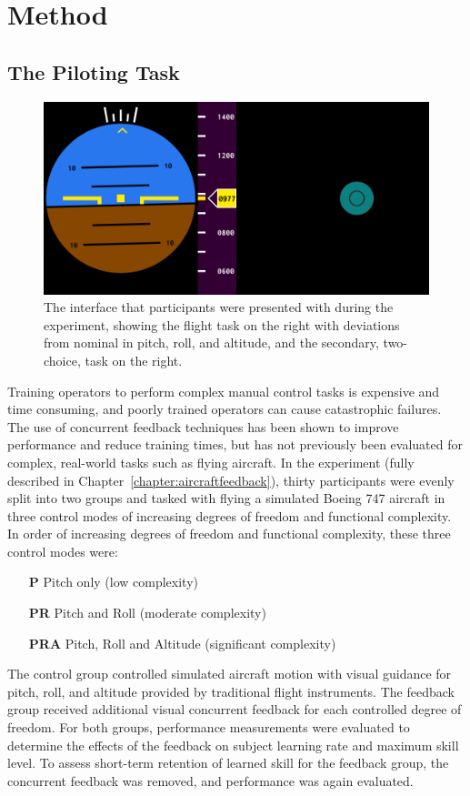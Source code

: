 \section{Method}

\subsection{The Piloting Task}

\begin{figure}[b]
    \centering
    \includegraphics[width=0.8\linewidth]{figures/Aircraft/image1.png}
    \caption[The interface]{The interface that participants were presented with during the experiment, showing the flight task on the right with deviations from nominal in pitch, roll, and altitude, and the secondary, two-choice, task on the right.}
    \label{fig:display}
\end{figure}

Training operators to perform complex manual control tasks is expensive and time consuming, and poorly trained operators can cause catastrophic failures.
The use of concurrent feedback techniques has been shown to improve performance and reduce training times, but has not previously been evaluated for complex, real-world tasks such as flying aircraft.
In the experiment (fully described in Chapter~\ref{chapter:aircraftfeedback}), thirty participants were evenly split into two groups and tasked with flying a simulated Boeing 747 aircraft in three control modes of increasing degrees of freedom and functional complexity.
In order of increasing degrees of freedom and functional complexity, these three control modes were:
\begin{itemize}
    \item[\textbf{P}] Pitch only (low complexity)
    \item[\textbf{PR}] Pitch and Roll (moderate complexity)
    \item[\textbf{PRA}] Pitch, Roll and Altitude (significant complexity)
\end{itemize}
The control group controlled simulated aircraft motion with visual guidance for pitch, roll, and altitude provided by traditional flight instruments.
The feedback group received additional visual concurrent feedback for each controlled degree of freedom.
For both groups, performance measurements were evaluated to determine the effects of the feedback on subject learning rate and maximum skill level.
To assess short-term retention of learned skill for the feedback group, the concurrent feedback was removed, and performance was again evaluated.

